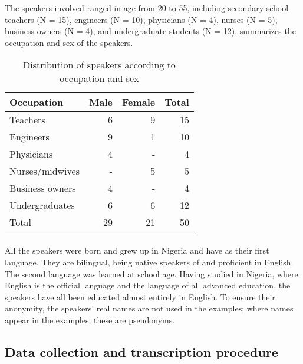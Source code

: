 \documentclass[output=paper]{langsci/langscibook}
\begin{document}
\largerpage[-1]
The speakers involved ranged in age from 20 to 55, including secondary school teachers (N = 15), engineers (N = 10), physicians (N = 4), nurses (N = 5), business owners (N = 4), and undergraduate students (N = 12).  summarizes the occupation and sex of the speakers. 
 
\begin{table}
\caption{Distribution of speakers according to occupation and sex}
\label{tab:Ihemere:1}

\begin{tabularx}{.66\textwidth}{Xrrr}
\lsptoprule
Occupation & Male & Female & Total\\
\midrule
Teachers & 6 & 9 & 15\\
Engineers & 9 & 1 & 10\\
Physicians & 4 & - & 4\\
Nurses/midwives & - & 5 & 5\\
Business owners & 4 & - & 4\\
Undergraduates & 6 & 6 & 12\\
\midrule
Total & 29 & 21 & 50\\
\lspbottomrule
\end{tabularx}

\end{table} 

All the speakers were born and grew up in Nigeria and have  as their first language. They are bilingual, being native speakers of  and proficient in English. The second language was learned at school age. Having studied in Nigeria, where English is the official language and the language of all advanced education, the speakers have all been educated almost entirely in English. To ensure their anonymity, the speakers’ real names are not used in the examples; where names appear in the examples, these are pseudonyms.

\subsection{Data collection and transcription procedure}
\end{document}
